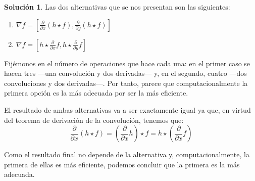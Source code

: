 \documentclass[a4paper, 11pt]{article}
\theoremstyle{definition}
\newtheorem*{solucion}{Solución}
\theoremstyle{theorem}
\begin{document}
  \begin{solucion}
      Las dos alternativas que se nos presentan son las siguientes:
      \begin{enumerate}
          \item $\nabla f=[\frac{\partial}{\partial x}(h \star f), \frac{\partial}{\partial y}(h \star f)]$
          \item $\nabla f=[h \star \frac{\partial}{\partial x}f, h \star \frac{\partial}{\partial y}f]$
      \end{enumerate}

      Fijémonos en el número de operaciones que hace cada una: en el primer caso se hacen tres ---una convolución y dos derivadas--- y, en el segundo, cuatro ---dos convoluciones y dos derivadas---. Por tanto, parece que computacionalmente la primera opción es la más adecuada por ser la más eficiente.

      El resultado de ambas alternativas va a ser exactamente igual ya que, en virtud del teorema de derivación de la convolución, tenemos que:
      \[
      \frac{\partial}{\partial x} (h \star f) = (\frac{\partial}{\partial x}h) \star f = h \star (\frac{\partial}{\partial x} f)
      \]

      Como el resultado final no depende de la alternativa y, computacionalmente, la primera de ellas es más eficiente, podemos concluir que la primera es la más adecuada.
  \end{solucion}
\end{document}
